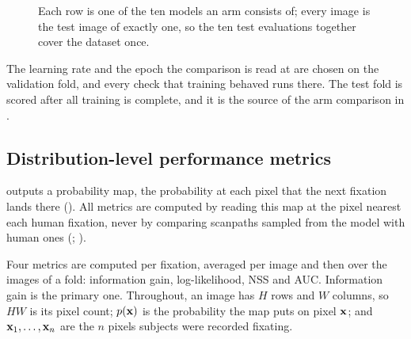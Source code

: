 \begin{figure}[tbp]
  \centering
  \caption[The ten-fold image-stratified partition]{Each row is one of the ten models an arm consists of; every image is the test image of exactly
    one, so the ten test evaluations together cover the dataset once.}
  \label{fig:cv-split}
\end{figure}

The learning rate and the epoch the comparison is read at are chosen on the validation fold, and every
check that training behaved runs there. The test fold is scored after all training is complete, and it
is the source of the arm comparison in .

\subsection{Distribution-level performance metrics}
\label{subsec:metrics}

\dg{} outputs a probability map, the probability at each pixel that the next fixation lands there
().
All metrics are computed by reading this map at the pixel nearest each human fixation, never by comparing
scanpaths sampled from the model with human ones (; \citealp{kummerer2021state}).

Four metrics are computed per fixation, averaged per image and then over the images of a fold:
information gain, log-likelihood, NSS and AUC. Information gain is the primary one.
Throughout, an image has $H$ rows and $W$ columns, so $HW$ is its pixel count; $p(\mathbf{x})$ is the
probability the map puts on pixel $\mathbf{x}$; and $\mathbf{x}_1, \ldots, \mathbf{x}_n$ are the $n$ pixels
subjects were recorded fixating.

